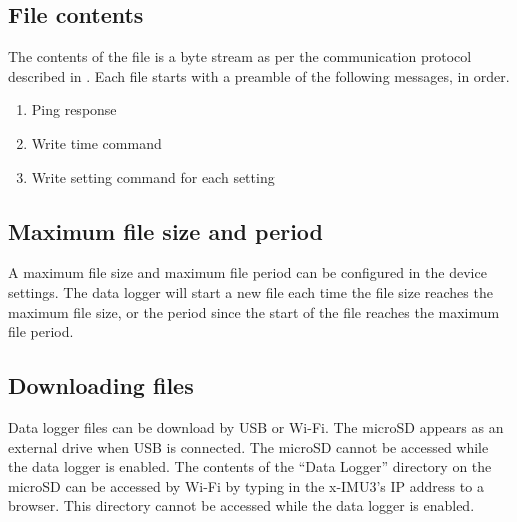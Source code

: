 \subsection{File contents}

The contents of the file is a byte stream as per the communication protocol described in .  Each file starts with a preamble of the following messages, in order.

\begin{enumerate}[nolistsep]
    \item Ping response
    \item Write time command
    \item Write setting command for each setting
\end{enumerate}

\subsection{Maximum file size and period}
\label{sec:maximumFileSizeAndPeriod}

A maximum file size and maximum file period can be configured in the device settings.  The data logger will start a new file each time the file size reaches the maximum file size, or the period since the start of the file reaches the maximum file period.

\subsection{Downloading files}

Data logger files can be download by \ac{USB} or Wi-Fi.  The \ac{microSD} appears as an external drive when \ac{USB} is connected.  The \ac{microSD} cannot be accessed while the data logger is enabled.  The contents of the \enquote{Data Logger} directory on the \ac{microSD} can be accessed by Wi-Fi by typing in the x-IMU3's \ac{IP} address to a browser.  This directory cannot be accessed while the data logger is enabled. 
